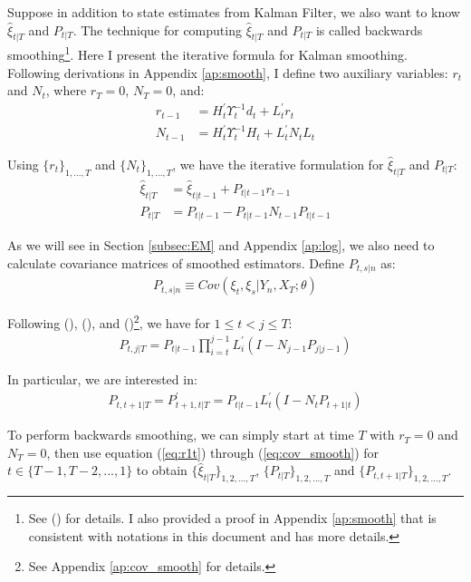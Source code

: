 \documentclass[10pt, titlepage]{article}
\numberwithin{equation}{section}
\begin{document}
Suppose in addition to state estimates from Kalman Filter, we also want to know $\hat{\xi}_{t|T}$ and $P_{t|T}$. The technique for computing $\hat{\xi}_{t|T}$ and $P_{t|T}$ is called backwards smoothing\footnote{See (\cite{dejong_1989}) for details. I also provided a proof in Appendix \ref{ap:smooth} that is consistent with notations in this document and has more details.}. Here I present the iterative formula for Kalman smoothing. Following derivations in Appendix \ref{ap:smooth}, I define two auxiliary variables: $r_{t}$ and $N_{t}$, where $r_T=0$, $N_T=0$, and:
\begin{align}
    r_{t-1} &= H_t^{'}\Upsilon_t^{-1}d_t + L_t^{'}r_t \label{eq:r1t} \\
    N_{t-1} &= H_t^{'}\Upsilon_t^{-1}H_t + L_t^{'}N_tL_t \label{eq:N1t}
\end{align}

Using $\{r_t\}_{1,...,T}$ and $\{N_t\}_{1,...,T}$, we have the iterative formulation for $\hat{\xi}_{t|T}$ and $P_{t|T}$:
\begin{align}
    \hat{\xi}_{t|T} &= \hat{\xi}_{t|t-1} + P_{t|t-1}r_{t-1} \label{eq:smooth_state2} \\
    P_{t|T} &= P_{t|t-1}- P_{t|t-1}N_{t-1}P_{t|t-1} \label{eq:smooth_P2}
\end{align}

As we will see in Section \ref{subsec:EM} and Appendix \ref{ap:log}, we also need to calculate covariance matrices of smoothed estimators. Define $P_{t,s|n}$ as:
\begin{align*}
    P_{t,s|n}\equiv Cov(\xi_t,\xi_{s}|Y_n,X_T;\theta)
\end{align*}

Following (\cite{koopman_1992}), (\cite{dejong_1988}), and (\cite{dejong_1989})\footnote{See Appendix \ref{ap:cov_smooth} for details.}, we have for $1\leq t < j \leq T$:
\begin{align*}
    P_{t,j|T} = P_{t|t-1}\prod_{i=t}^{j-1}L_i^{'}(I-N_{j-1}P_{j|j-1}) 
\end{align*}

In particular, we are interested in:
\begin{align}
    P_{t,t+1|T} = P_{t+1,t|T}^{'} = P_{t|t-1}L_t^{'}(I-N_tP_{t+1|t}) \label{eq:cov_smooth}
\end{align}

To perform backwards smoothing, we can simply start at time $T$ with $r_T=0$ and $N_T=0$, then use equation (\ref{eq:r1t}) through (\ref{eq:cov_smooth}) for $t\in\{T-1,T-2,...,1\}$ to obtain $\{\hat{\xi}_{t|T}\}_{1,2,...,T}$, $\{P_{t|T}\}_{1,2,...,T}$ and $\{P_{t,t+1|T}\}_{1,2,...,T}$.
\end{document}
